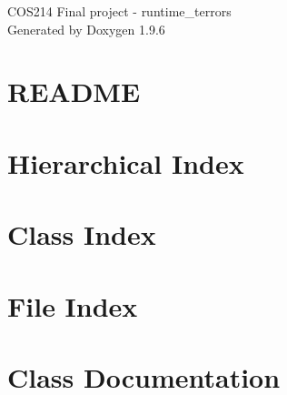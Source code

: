 \documentclass[twoside]{book}
\newcommand{\+}{\discretionary{\mbox{\scriptsize$\hookleftarrow$}}{}{}}
\newcommand{\clearemptydoublepage}{%
    \newpage{\pagestyle{empty}\cleardoublepage}%
  }
\begin{document}
  \raggedbottom
    \hypersetup{pageanchor=false,
                bookmarksnumbered=true,
                pdfencoding=unicode
               }
  \begin{titlepage}
  \vspace*{7cm}
  \begin{center}%
  {\Large COS214 Final project -\/ runtime\+\_\+terrors}\\
  \vspace*{1cm}
  {\large Generated by Doxygen 1.9.6}\\
  \end{center}
  \end{titlepage}
  \clearemptydoublepage
  \tableofcontents
  \clearemptydoublepage
  \hypersetup{pageanchor=true}
\chapter{README}
\label{md_README}

\chapter{Hierarchical Index}

\chapter{Class Index}

\chapter{File Index}

\chapter{Class Documentation}













































\end{document}
